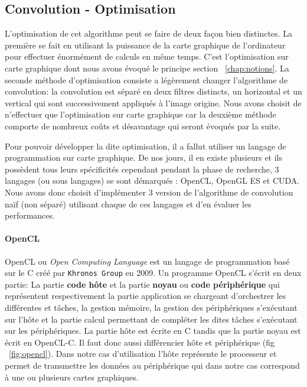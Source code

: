 \subsection{Convolution - Optimisation}
L'optimisation de cet algorithme peut se faire de deux façon bien distinctes. La première se fait en utilisant la puissance de la carte graphique de l'ordinateur pour effectuer énormément de calculs en même temps. C'est l'optimisation sur carte graphique dont nous avons évoqué le principe section ~\ref{chap:notions}. La seconde méthode d'optimisation consiste a légèrement changer l'algorithme de convolution: la convolution est séparé en deux filtres distincts\cite{podlozhnyuk2007image}, un horizontal et un vertical qui sont successivement appliqués à l'image origine.
Nous avons choisit de n'effectuer que l'optimisation sur carte graphique car la deuxième méthode comporte de nombreux coûts et désavantage qui seront évoqués par la suite. %

Pour pouvoir développer la dite optimisation, il a fallut utiliser un langage de programmation sur carte graphique. De nos jours, il en existe plusieurs et ils possèdent tous leurs spécificités cependant pendant la phase de recherche, 3 langages (ou sous langages) se sont démarqués : OpenCL\cite{opencl}, OpenGL ES\cite{opengles} et CUDA\cite{cuda}. Nous avons donc choisit d'implémenter 3 version de l'algorithme de convolution naïf (non séparé) utilisant chaque de ces langages et d'en évaluer les performances. %

\paragraph{OpenCL} OpenCL ou \emph{Open Computing Language} est un langage de programmation basé sur le C créé par \texttt{Khronos Group} en 2009.
Un programme OpenCL s'écrit en deux partie:
La partie \textbf{code hôte} et la partie \textbf{noyau} ou \textbf{code périphérique} qui représentent respectivement la partie application se chargeant d'orchestrer les différentes et tâches, la gestion mémoire, la gestion des périphériques s'exécutant sur l'hôte et la partie calcul permettant de compléter les dites tâches s'exécutant sur les périphériques. La partie hôte est écrite en C tandis que la partie noyau est écrit en OpenCL-C.
Il faut donc aussi différencier hôte et périphérique (fig ~\ref{fig:opencl}). Dans notre cas d'utilisation l'hôte représente le processeur et permet de transmettre les données au périphérique qui dans notre cas correspond à une ou plusieurs cartes graphiques.

